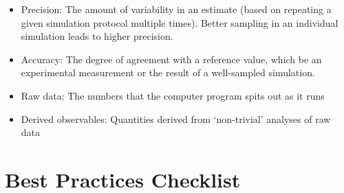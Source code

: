 \documentclass[9pt]{livecoms}
\begin{document}
\begin{itemize}
   \item Precision: The amount of variability in an estimate (based on repeating a given simulation protocol multiple times).  
      Better sampling in an individual simulation leads to higher precision.
    \item Accuracy: The degree of agreement with a reference value, which be an experimental measurement or the result of a well-sampled simulation.
    \item Raw data: The numbers that the computer program spits out as it runs
    \item Derived observables:  Quantities derived from ‘non-trivial’ analyses of raw data
\end{itemize}

\section{Best Practices Checklist}
\end{document}
